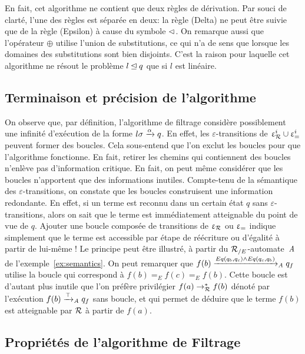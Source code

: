 En fait, cet algorithme ne contient que deux règles de dérivation. Par souci de clarté, l'une des règles est séparée en deux:
la règle (Delta) ne peut être suivie que de la règle (Epsilon) à cause du symbole $\lhd$. On remarque aussi que l'opérateur $\oplus$
utilise l'union de substitutions, ce qui n'a de sens que lorsque les domaines des substitutions sont bien disjoints. C'est la raison
pour laquelle cet algorithme ne résout le problème $l \unlhd q$ que si $l$ est linéaire.

\subsection{Terminaison et précision de l'algorithme}

On observe que, par définition, l'algorithme de filtrage considère possiblement
une infinité d'exécution de la forme $l\sigma \xrightarrow{\alpha} q$.
En effet, les $\varepsilon$-transitions de $\upvarepsilon_{\mathcal R}^i \cup \upvarepsilon_{=}^i$ peuvent former des boucles. 
Cela sous-entend que l'on exclut les boucles pour que l'algorithme fonctionne.
En fait, retirer les chemins qui contiennent des boucles n'enlève pas d'information
critique. En fait, on peut même considérer que les boucles n'apportent que des
informations inutiles. Compte-tenu de la sémantique des $\varepsilon$-transitions, 
on constate que les boucles construisent une information redondante. En effet, si un
terme est reconnu dans un certain état $q$ sans $\varepsilon$-transitions, alors on sait
que le terme est immédiatement atteignable du point de vue de $q$. Ajouter une boucle composée
de transitions de $\upvarepsilon_{\mathcal R}$ ou $\upvarepsilon_{=}$ indique simplement que le terme est accessible par étape de 
réécriture ou d'égalité à partir de lui-même ! Le principe peut être illustré, à partir du ${\mathcal R_{/E}}$-automate~$\mathit A$
de l'exemple~\ref{ex:semantics}. On peut remarquer que $f(b) \xrightarrow{Eq(q_b, q_c)
  \land Eq(q_c, q_b)}_\mathit A q_f$ utilise la boucle qui correspond à $f(b) =_E f(c) =_E f(b)$. 
Cette boucle est d'autant plus inutile que l'on préfère privilégier $f(a) \rightarrow_\mathcal R^* f(b)$ 
dénoté par l'exécution $f(b) \xrightarrow{\top}_\mathit A q_f$ sans boucle, et qui permet de déduire que le terme $f(b)$
est atteignable par $\mathcal R$ à partir de $f(a)$.

\subsection{Propriétés de l'algorithme de Filtrage}

